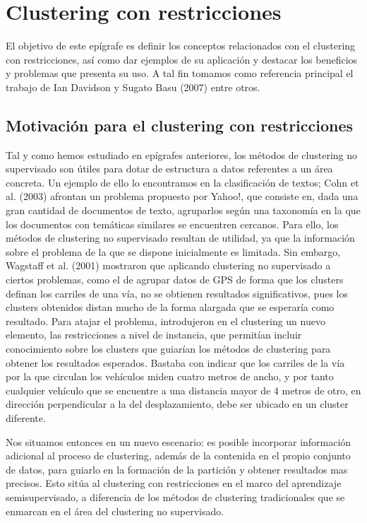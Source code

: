 \chapter{Clustering con restricciones}\label{ch:Clustering con restricciones}

El objetivo de este epígrafe es definir los conceptos relacionados con el clustering con restricciones, así como dar ejemplos de su aplicación y destacar los beneficios y problemas que presenta su uso. A tal fin tomamos como referencia principal el trabajo de Ian Davidson y Sugato Basu (2007) \cite{Survey:2007} entre otros.

\section{Motivación para el clustering con restricciones}

Tal y como hemos estudiado en epígrafes anteriores, los métodos de clustering no supervisado son útiles para dotar de estructura a datos referentes a un área concreta. Un ejemplo de ello lo encontramos en la clasificación de textos; Cohn et al. (2003) \cite{Cohn:2003} afrontan un problema propuesto por Yahoo!, que consiste en, dada una gran cantidad de documentos de texto, agruparlos según una taxonomía en la que los documentos con temáticas similares se encuentren cercanos. Para ello, los métodos de clustering no supervisado resultan de utilidad, ya que la información sobre el problema de la que se dispone inicialmente es limitada. Sin embargo, Wagstaff et al. (2001) mostraron que aplicando clustering no supervisado a ciertos problemas, como el de agrupar datos de GPS de forma que los clusters definan los carriles de una vía, no se obtienen resultados significativos, pues los clusters obtenidos distan mucho de la forma alargada que se esperaría como resultado. Para atajar el problema, introdujeron en el clustering un nuevo elemento, las restricciones a nivel de instancia, que permitían incluir conocimiento sobre los clusters que guiarían los métodos de clustering para obtener los resultados esperados. Bastaba con indicar que los carriles de la vía por la que circulan los vehículos miden cuatro metros de ancho, y por tanto cualquier vehículo que se encuentre a una distancia mayor de 4 metros de otro, en dirección perpendicular a la del desplazamiento, debe ser ubicado en un cluster diferente.

Nos situamos entonces en un nuevo escenario: es posible incorporar información adicional al proceso de clustering, además de la contenida en el propio conjunto de datos, para guiarlo en la formación de la partición y obtener resultados mas precisos. Esto sitúa al clustering con restricciones en el marco del aprendizaje semisupervisado, a diferencia de los métodos de clustering tradicionales que se enmarcan en el área del clustering no supervisado. 

